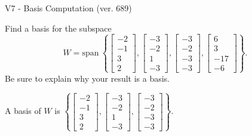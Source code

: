 \begin{exercise}
  \begin{exerciseTitle}V7 - Basis Computation (ver. 689)\end{exerciseTitle}
  \begin{exerciseStatement}
    Find a basis for the subspace 
\[W=\mathrm{span}\ \left\{\left[\begin{array}{r}
-2 \\
-1 \\
3 \\
2
\end{array}\right] , \left[\begin{array}{r}
-3 \\
-2 \\
1 \\
-3
\end{array}\right] , \left[\begin{array}{r}
-3 \\
-2 \\
-3 \\
-3
\end{array}\right] , \left[\begin{array}{r}
6 \\
3 \\
-17 \\
-6
\end{array}\right]\right\}.\]
 Be sure to explain why your result is a basis.


  \end{exerciseStatement}
  \begin{exerciseAnswer}
   A basis of \(W\) is  \(\left\{\left[\begin{array}{r}
-2 \\
-1 \\
3 \\
2
\end{array}\right] , \left[\begin{array}{r}
-3 \\
-2 \\
1 \\
-3
\end{array}\right] , \left[\begin{array}{r}
-3 \\
-2 \\
-3 \\
-3
\end{array}\right]\right\}\).
  


  \end{exerciseAnswer}
\end{exercise}